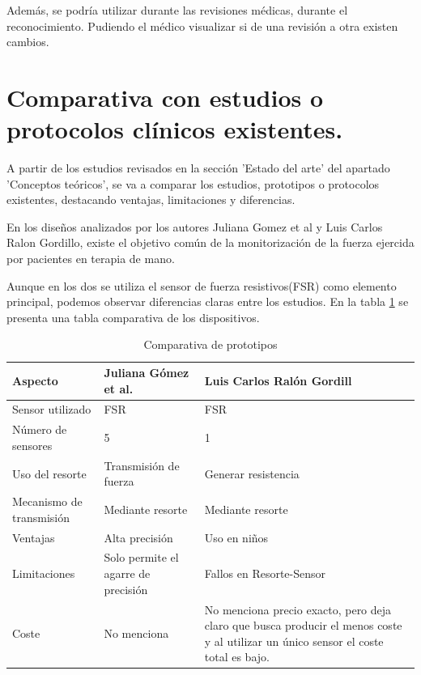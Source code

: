 Además, se podría utilizar durante las revisiones médicas, durante el reconocimiento. Pudiendo el médico visualizar si de una revisión a otra existen cambios. 

\section{ Comparativa con estudios o protocolos clínicos existentes.}

A partir de los estudios revisados en la sección 'Estado del arte' del apartado 'Conceptos teóricos', se va a comparar los estudios, prototipos o protocolos existentes, destacando ventajas, limitaciones y diferencias.

En los diseños analizados por los autores Juliana Gomez et al y Luis Carlos Ralon Gordillo, existe el objetivo común de la monitorización de la fuerza ejercida por pacientes en terapia de mano. 

Aunque en los dos se utiliza el sensor de fuerza resistivos(FSR) como elemento principal, podemos observar diferencias claras entre los estudios. En la tabla \ref{tab:comparativa_prototipos} se presenta una tabla comparativa de los dispositivos.
\begin{table}[h]
    \begin{tabular}{|p{3.5cm}|p{5cm}|p{6cm}|}
    \hline
    \rowcolor[HTML]{BFBFBF} 
    \textbf{Aspecto} & \textbf{Juliana Gómez et al.} & \textbf{Luis Carlos Ralón Gordill} \\ \hline
    Sensor utilizado & FSR & FSR  \\ \hline
    Número de sensores & 5 & 1 \\ \hline
    Uso del resorte & Transmisión de fuerza & Generar resistencia \\ \hline
    Mecanismo de transmisión & Mediante resorte & Mediante resorte\\ \hline
    Ventajas & Alta precisión & Uso en niños \\ \hline
    Limitaciones & Solo permite el agarre de precisión & Fallos en Resorte-Sensor  \\ \hline
    Coste  & No menciona & No menciona precio exacto, pero deja claro que busca producir el menos coste y al utilizar un único sensor el coste total es bajo.  \\ \hline
    \end{tabular}
    \caption{Comparativa de prototipos}
    \label{tab:comparativa_prototipos}
\end{table}

